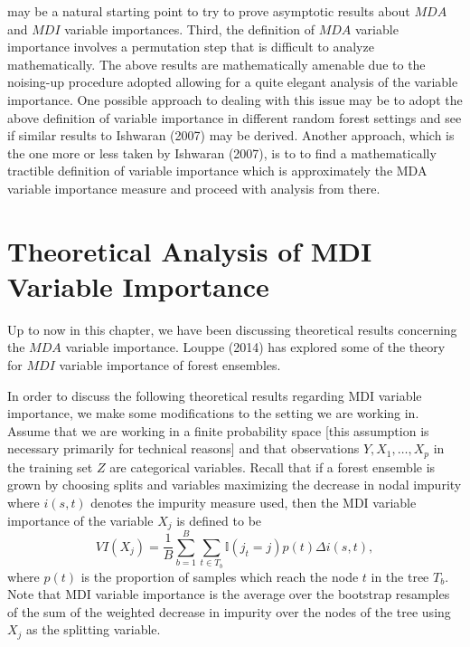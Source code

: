 \documentclass[12pt,twoside]{reedthesis}
\theoremstyle{definition}
\theoremstyle{definition}
\theoremstyle{definition}
\theoremstyle{remark}
\begin{document}
may be a natural starting point to try to prove asymptotic results about
\(MDA\) and \(MDI\) variable importances. Third, the definition of
\(MDA\) variable importance involves a permutation step that is
difficult to analyze mathematically. The above results are
mathematically amenable due to the noising-up procedure adopted allowing
for a quite elegant analysis of the variable importance. One possible
approach to dealing with this issue may be to adopt the above definition
of variable importance in different random forest settings and see if
similar results to Ishwaran (2007) may be derived. Another approach,
which is the one more or less taken by Ishwaran (2007), is to to find a
mathematically tractible definition of variable importance which is
approximately the MDA variable importance measure and proceed with
analysis from there. \par

\section{Theoretical Analysis of MDI Variable
Importance}\label{theoretical-analysis-of-mdi-variable-importance}

Up to now in this chapter, we have been discussing theoretical results
concerning the \(MDA\) variable importance. Louppe (2014) has explored
some of the theory for \(MDI\) variable importance of forest ensembles.
\par

In order to discuss the following theoretical results regarding MDI
variable importance, we make some modifications to the setting we are
working in. Assume that we are working in a finite probability space
{[}this assumption is necessary primarily for technical reasons{]} and
that observations \(Y,X_1,\ldots,X_p\) in the training set \(Z\) are
categorical variables. Recall that if a forest ensemble is grown by
choosing splits and variables maximizing the decrease in nodal impurity
where \(i(s,t)\) denotes the impurity measure used, then the MDI
variable importance of the variable \(X_j\) is defined to be
\[VI(X_j)=\frac{1}{B}\sum_{b=1}^B \sum_{t\in T_b} \mathbb{I}(j_t=j)p(t)\Delta i(s,t),\]
where \(p(t)\) is the proportion of samples which reach the node \(t\)
in the tree \(T_b\). Note that MDI variable importance is the average
over the bootstrap resamples of the sum of the weighted decrease in
impurity over the nodes of the tree using \(X_j\) as the splitting
variable. \par
\end{document}
